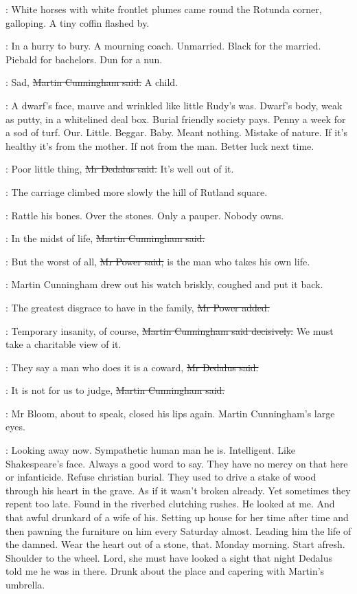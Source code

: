:
White horses with white frontlet plumes came round the Rotunda corner,
galloping.
A tiny coffin flashed by.

\BloomInt:
In a hurry to bury.
A mourning coach.
Unmarried.
Black for the married.
Piebald for bachelors.
Dun for a nun.

\cunningham:
Sad,
\sout{Martin Cunningham said.}
A child.

\BloomInt:
A dwarf's face, mauve and wrinkled like little Rudy's was.
Dwarf's body, weak as putty, in a whitelined deal box.
Burial friendly society pays.
Penny a week for a sod of turf.
Our.
Little.
Beggar.
Baby.
Meant nothing.
Mistake of nature.
If it's healthy it's from the mother.
If not from the man.
Better luck
next time.

\simon:
Poor little thing,
\sout{Mr Dedalus said.}
It's well out of it.

:
The carriage climbed more slowly the hill of Rutland square.

\BloomInt:
Rattle his bones.
Over the stones.
Only a pauper.
Nobody owns.

\cunningham:
In the midst of life,
\sout{Martin Cunningham said.}

\power:
But the worst of all,
\sout{Mr Power said,}
is the man who takes his own life.

:
Martin Cunningham drew out his watch briskly,
coughed and put it back.

\power:
The greatest disgrace to have in the family,
\sout{Mr Power added.}

\cunningham:
Temporary insanity, of course,
\sout{Martin Cunningham said decisively.}
We must take
a charitable view of it.

\simon:
They say a man who does it is a coward,
\sout{Mr Dedalus said.}

\cunningham:
It is not for us to judge,
\sout{Martin Cunningham said.}

:
Mr Bloom, about to speak, closed his lips again.
Martin Cunningham's large eyes.

\BloomInt:
Looking away now.
Sympathetic human man he is.
Intelligent.
Like Shakespeare's face.
Always a good word to say.
They have no mercy on that here or infanticide.
Refuse christian burial.
They used to drive a stake of wood through his heart in the grave.
As if it wasn't broken already.
Yet sometimes they repent too late.
Found in the riverbed clutching rushes.
He looked at me.
And that awful drunkard of a wife of his.
Setting up house for her time after time
and then pawning the furniture on him every Saturday almost.
Leading him the life of the damned.
Wear the heart out of a stone, that.
Monday morning.
Start afresh.
Shoulder to the wheel.
Lord, she must have looked a sight that night Dedalus told me he was in there.
Drunk about the place and capering with Martin's umbrella.

